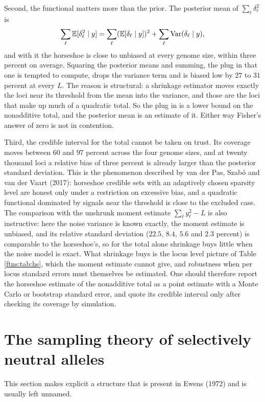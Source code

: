 Second, the functional matters more than the prior. The posterior mean of $\sum_\ell\delta^2_\ell$
is
\[
\sum_\ell\mathbb{E}[\delta_\ell^2\mid y]=\sum_\ell(\mathbb{E}[\delta_\ell\mid y])^2+\sum_\ell\operatorname{Var}(\delta_\ell\mid y),
\]
and with it the horseshoe is close to unbiased at every genome size, within three percent on
average. Squaring the posterior means and summing, the plug in that one is tempted to compute,
drops the variance term and is biased low by $27$ to $31$ percent at every $L$. The reason is
structural: a shrinkage estimator moves exactly the loci near its threshold from the mean into the
variance, and those are the loci that make up much of a quadratic total. So the plug in is a lower
bound on the nonadditive total, and the posterior mean is an estimate of it. Either way Fisher's
answer of zero is not in contention.

Third, the credible interval for the total cannot be taken on trust. Its coverage moves between $60$
and $97$ percent across the four genome sizes, and at twenty thousand loci a relative bias of three
percent is already larger than the posterior standard deviation. This is the phenomenon described
by van der Pas, Szab\'o and van der Vaart (2017): horseshoe credible sets with an adaptively chosen
sparsity level are honest only under a restriction on excessive bias, and a quadratic functional
dominated by signals near the threshold is close to the excluded case. The comparison with the
unshrunk moment estimate $\sum_\ell y_\ell^2-L$ is also instructive: here the noise variance is
known exactly, the moment estimate is unbiased, and its relative standard deviation ($22.5$, $8.4$,
$5.6$ and $2.3$ percent) is comparable to the horseshoe's, so for the total alone shrinkage buys
little when the noise model is exact. What shrinkage buys is the locus level picture of
Table \ref{ftns:tab:hs}, which the moment estimate cannot give, and robustness when per locus
standard errors must themselves be estimated. One should therefore report the horseshoe estimate of
the nonadditive total as a point estimate with a Monte Carlo or bootstrap standard error, and quote
its credible interval only after checking its coverage by simulation.

\section{The sampling theory of selectively neutral alleles}
\label{ftns:sec:esf}

This section makes explicit a structure that is present in Ewens (1972) and is usually left
unnamed.

